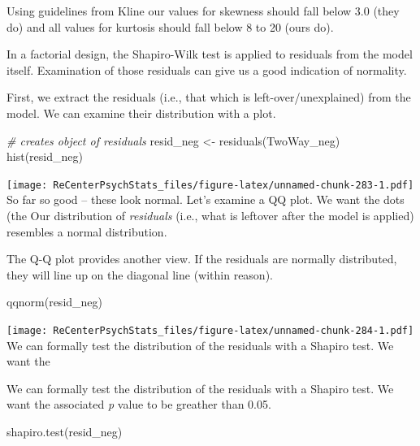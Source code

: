 \documentclass[
  11pt,
]{book}
\newenvironment{Shaded}{\begin{snugshade}}{\end{snugshade}}
\newcommand{\CommentTok}[1]{\textcolor[rgb]{0.56,0.35,0.01}{\textit{#1}}}
\newcommand{\FunctionTok}[1]{\textcolor[rgb]{0.00,0.00,0.00}{#1}}
\newcommand{\NormalTok}[1]{#1}
\newcommand{\OtherTok}[1]{\textcolor[rgb]{0.56,0.35,0.01}{#1}}
\begin{document}
Using guidelines from Kline \citeyearpar{kline_principles_2016} our values for skewness should fall below 3.0 (they do) and all values for kurtosis should fall below 8 to 20 (ours do).

In a factorial design, the Shapiro-Wilk test is applied to residuals from the model itself. Examination of those residuals can give us a good indication of normality.

First, we extract the residuals (i.e., that which is left-over/unexplained) from the model. We can examine their distribution with a plot.

\begin{Shaded}
\begin{Highlighting}[]
\CommentTok{\# creates object of residuals}
\NormalTok{resid\_neg }\OtherTok{\textless{}{-}} \FunctionTok{residuals}\NormalTok{(TwoWay\_neg)}
\FunctionTok{hist}\NormalTok{(resid\_neg)}
\end{Highlighting}
\end{Shaded}

\texttt{[image: ReCenterPsychStats\_files/figure-latex/unnamed-chunk-283-1.pdf]}
So far so good -- these look normal. Let's examine a QQ plot. We want the dots (the
Our distribution of \emph{residuals} (i.e., what is leftover after the model is applied) resembles a normal distribution.

The Q-Q plot provides another view. If the residuals are normally distributed, they will line up on the diagonal line (within reason).

\begin{Shaded}
\begin{Highlighting}[]
\FunctionTok{qqnorm}\NormalTok{(resid\_neg)}
\end{Highlighting}
\end{Shaded}

\texttt{[image: ReCenterPsychStats\_files/figure-latex/unnamed-chunk-284-1.pdf]}
We can formally test the distribution of the residuals with a Shapiro test. We want the

We can formally test the distribution of the residuals with a Shapiro test. We want the associated \emph{p} value to be greather than 0.05.

\begin{Shaded}
\begin{Highlighting}[]
\FunctionTok{shapiro.test}\NormalTok{(resid\_neg)}
\end{Highlighting}
\end{Shaded}
\end{document}
